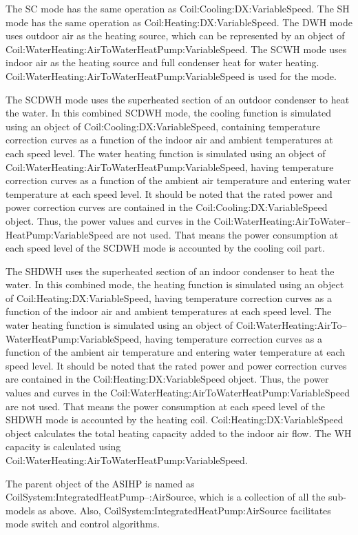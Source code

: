 The SC mode has the same operation as Coil:Cooling:DX:VariableSpeed. The SH mode has the same operation as Coil:Heating:DX:VariableSpeed. The DWH mode uses outdoor air as the heating source, which can be represented by an object of Coil:WaterHeating:AirToWaterHeatPump:VariableSpeed. The SCWH mode uses indoor air as the heating source and full condenser heat for water heating.  Coil:WaterHeating:AirToWaterHeatPump:VariableSpeed is used for the mode.

The SCDWH mode uses the superheated section of an outdoor condenser to heat the water. In this combined SCDWH mode, the cooling function is simulated using an object of Coil:Cooling:DX:VariableSpeed, containing temperature correction curves as a function of the indoor air and ambient temperatures at each speed level. The water heating function is simulated using an object of Coil:WaterHeating:AirToWaterHeatPump:VariableSpeed, having temperature correction curves as a function of the ambient air temperature and entering water temperature at each speed level.  It should be noted that the rated power and power correction curves are contained in the Coil:Cooling:DX:VariableSpeed object. Thus, the power values and curves in the Coil:WaterHeating:AirToWater--HeatPump:VariableSpeed are not used. That means the power consumption at each speed level of the SCDWH mode is accounted by the cooling coil part.

The SHDWH uses the superheated section of an indoor condenser to heat the water. In this combined mode, the heating function is simulated using an object of Coil:Heating:DX:VariableSpeed, having temperature correction curves as a function of the indoor air and ambient temperatures at each speed level. The water heating function is simulated using an object of Coil:WaterHeating:AirTo--WaterHeatPump:VariableSpeed, having temperature correction curves as a function of the ambient air temperature and entering water temperature at each speed level. It should be noted that the rated power and power correction curves are contained in the Coil:Heating:DX:VariableSpeed object. Thus, the power values and curves in the Coil:WaterHeating:AirToWaterHeatPump:VariableSpeed are not used. That means the power consumption at each speed level of the SHDWH mode is accounted by the heating coil. Coil:Heating:DX:VariableSpeed object calculates the total heating capacity added to the indoor air flow. The WH capacity is calculated using Coil:WaterHeating:AirToWaterHeatPump:VariableSpeed.

The parent object of the ASIHP is named as CoilSystem:IntegratedHeatPump--:AirSource, which is a collection of all the sub-models as above. Also, CoilSystem:IntegratedHeatPump:AirSource facilitates mode switch and control algorithms.


